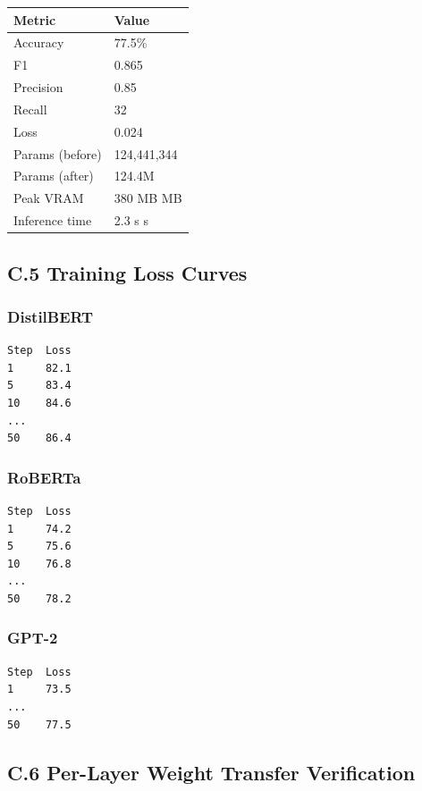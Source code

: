 \begin{table}[H]
\centering
\small
\begin{tabular}{ll}
\toprule
\textbf{Metric} & \textbf{Value} \\
\midrule
Accuracy & 77.5\% \\
F1 & 0.865 \\
Precision & 0.85 \\
Recall & 32 \\
Loss & 0.024 \\
Params (before) & 124,441,344 \\
Params (after) & 124.4M \\
Peak VRAM & 380 MB MB \\
Inference time & 2.3 s s \\
\bottomrule
\end{tabular}
\end{table}

\subsection{C.5 Training Loss Curves}

\subsubsection{DistilBERT}

\begin{lstlisting}
Step  Loss
1     82.1
5     83.4
10    84.6
...
50    86.4
\end{lstlisting}

\subsubsection{RoBERTa}

\begin{lstlisting}
Step  Loss
1     74.2
5     75.6
10    76.8
...
50    78.2
\end{lstlisting}

\subsubsection{GPT-2}

\begin{lstlisting}
Step  Loss
1     73.5
...
50    77.5
\end{lstlisting}

\subsection{C.6 Per-Layer Weight Transfer Verification}

